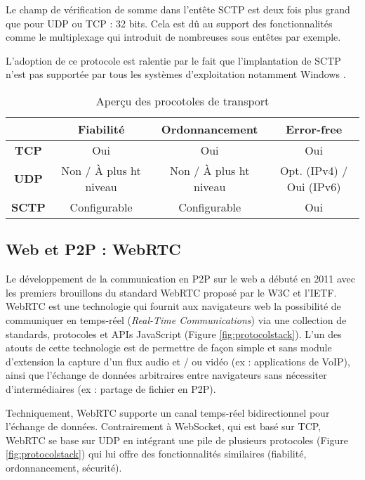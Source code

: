 Le champ de vérification de somme dans l'entête \gls{SCTP} est deux fois plus 
grand que pour \gls{UDP} ou \gls{TCP} : 32 bits. Cela est dû au support des 
fonctionnalités comme le multiplexage qui introduit de nombreuses sous entêtes 
par exemple.

L'adoption de ce protocole est ralentie par le fait que l'implantation de \gls{SCTP} 
n'est pas supportée par tous les systèmes d'exploitation notamment 
Windows \cite{Hogg}. 

\begin{table}[h]
	\caption{Aperçu des procotoles de transport}
	\noindent\small
	\begin{tabular}{cccc}
		& \textbf{Fiabilité} & \textbf{Ordonnancement} & \textbf{Error-free} \\ 
		\hline 
		\textbf{TCP} & Oui & Oui & Oui \\ 
		\hline 
		\textbf{UDP} & Non / À plus ht niveau & Non / À plus 
		ht 
		niveau & Opt. 
		(IPv4) / 
		Oui (IPv6) \\ 
		\hline 
		\textbf{SCTP} & Configurable & Configurable &  Oui \\ 
		\hline
	\end{tabular} 
\end{table}

\subsection{Web et P2P : WebRTC}
\label{sec:webrtc}
Le développement de la communication en \gls{P2P} sur le web a 
débuté en 2011 avec les premiers brouillons du standard \gls{WebRTC} proposé 
par le \gls{W3C} et l'\gls{IETF}\textsuperscript{\textregistered}. 
\gls{WebRTC} est une technologie qui fournit aux navigateurs web la possibilité de 
communiquer en temps-réel (\textit{Real-Time Communications}) via une collection 
de standards, protocoles et \glspl{API} JavaScript (Figure \ref{fig:protocolstack}). 
L'un des atouts de cette technologie est de permettre de façon simple et 
sans module d'extension la capture d'un flux audio et / ou vidéo (ex : 
applications de VoIP), ainsi que l'échange de données arbitraires entre 
navigateurs sans nécessiter d'intermédiaires (ex : partage de fichier en 
P2P).


Techniquement, \gls{WebRTC} supporte un canal temps-réel 
bidirectionnel pour l'échange de données. Contrairement à 
\gls{WebSocket}, qui est basé sur \gls{TCP}, \gls{WebRTC} se base sur 
\acrshort{UDP} en intégrant une pile de plusieurs protocoles (Figure 
\ref{fig:protocolstack}) qui lui offre des fonctionnalités similaires (fiabilité, 
ordonnancement, sécurité). 


